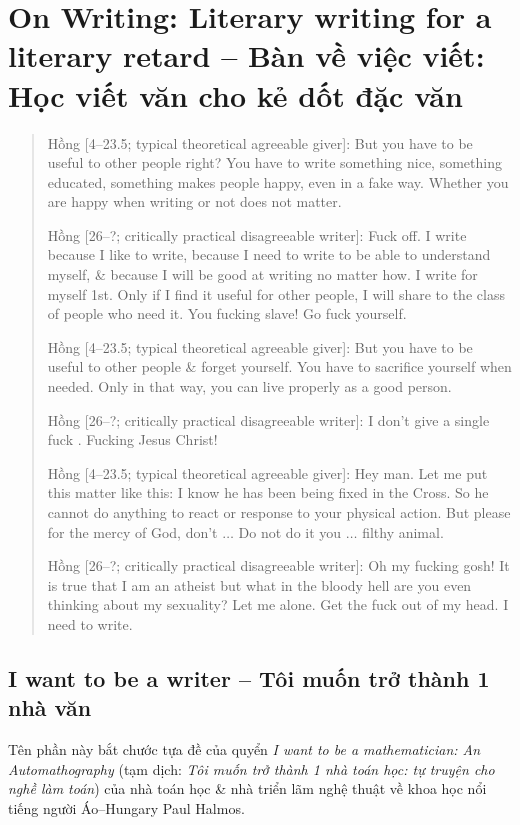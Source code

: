 \documentclass[12pt]{article}
\begin{document}
\section{On Writing: Literary writing for a literary retard -- Bàn về việc viết: Học viết văn cho kẻ dốt đặc văn}

\begin{quote}
	{\sf Hồng [4--23.5; typical theoretical agreeable giver]}: But you have to be useful to other people right? You have to write something nice, something educated, something makes people happy, even in a fake way. Whether you are happy when writing or not does not matter.
	
	{\sf Hồng [26--?; critically practical disagreeable writer]}: Fuck off. I write because I like to write, because I need to write to be able to understand myself, \& because I will be good at writing no matter how. I write for myself 1st. Only if I find it useful for other people, I will share to the class of people who need it. You fucking slave! Go fuck yourself.
	
	{\sf Hồng [4--23.5; typical theoretical agreeable giver]}: But you have to be useful to other people \& forget yourself. You have to sacrifice yourself when needed. Only in that way, you can live properly as a good person.
	
	{\sf Hồng [26--?; critically practical disagreeable writer]}: I don't give a single fuck \cite{Manson_giving_fuck,Manson_giving_fuck_vn}. Fucking Jesus Christ!
	
	{\sf Hồng [4--23.5; typical theoretical agreeable giver]}: Hey man. Let me put this matter like this: I know he has been being fixed in the Cross. So he cannot do anything to react or response to your physical action. But please for the mercy of God, don't $\ldots$ Do not do it you $\ldots$ filthy animal.
	
	{\sf Hồng [26--?; critically practical disagreeable writer]}: Oh my fucking gosh! It is true that I am an atheist but what in the bloody hell are you even thinking about my sexuality? Let me alone. Get the fuck out of my head. I need to write.
\end{quote}

\subsection{I want to be a writer -- Tôi muốn trở thành 1 nhà văn}
\label{sect: writer wannabe}
Tên phần này bắt chước tựa đề của quyển {\it I want to be a mathematician: An Automathography} \cite{Halmos1985,Halmos1985_3_parts} (tạm dịch: {\it Tôi muốn trở thành 1 nhà toán học: tự truyện cho nghề làm toán}) của nhà toán học \& nhà triển lãm nghệ thuật về khoa học nổi tiếng người Áo--Hungary {\sc Paul Halmos}.
\end{document}
